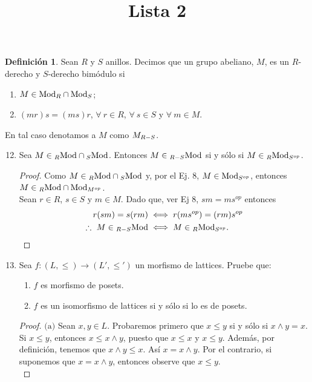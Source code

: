 \documentclass{article}
\title{Lista 2}
\author{}
\date{}
\newcommand{\lrprth}[1]{
	\left(#1\right)
}
\newcommand{\opst}[1]{
	{#1}^{op}
}
\newcommand{\ringmod}[3]{
	\if#3l
	{}_{#1}#2
	\else
	\if#3r
	#2_{#1}
	\fi
	\fi
}
\newcommand{\ringbimod}[4]{
	\if#4l
	{}_{#1-#2}#3
	\else
	\if#4r
	#3_{#1-#2}
	\else 
	\ifstrequal{#4}{lr}{
		{}_{#1}#3_{#2}
	}
	\fi
	\fi
}
\theoremstyle{definition}
\newtheorem{define}{Definición}
\theoremstyle{plain}
\theoremstyle{plain}
\theoremstyle{definition}
\theoremstyle{definition}
\theoremstyle{definition}
\theoremstyle{definition}
\theoremstyle{definition}
\theoremstyle{definition}
\begin{document}
	
	\maketitle
\begin{define}
	Sean $R$ y $S$ anillos. Decimos que un grupo abeliano, $M$, es un $R$-derecho y $S$-derecho bimódulo si
	\begin{enumerate}[label=\roman*)]
		\item $M\in\ringmod{R}{\text{Mod}}{r}\cap\ringmod{S}{\text{Mod}}{r}$;
		\item $(mr)s=(ms)r$, $\forall\ r\in R$, $\forall\ s\in S$ y $\forall\ m\in M$.
	\end{enumerate}
	En tal caso denotamos a $M$ como $\ringbimod{R}{S}{M}{r}$.
\end{define}
	\begin{enumerate}[label=\textbf{Ej \arabic*.}]
		\setcounter{enumi}{11}
\item Sea $M\in\ringmod{R}{\text{Mod}}{l}\cap\ringmod{S}{\text{Mod}}{l}$. Entonces $M\in\ringbimod{R}{S}{\text{Mod}}{l}$ si y sólo si $M\in\ringbimod{R}{\opst{S}}{\text{Mod}}{lr}$.
\begin{proof}
	Como $M\in\ringmod{R}{\text{Mod}}{l}\cap\ringmod{S}{\text{Mod}}{l}$ y, por el Ej. 8, $M\in\ringmod{\opst{S}}{\text{Mod}}{r}$, entonces $M\in\ringmod{R}{\text{Mod}}{l}\cap\ringmod{\opst{M}}{\text{Mod}}{r}$.\\ Sean $r\in R$, $s\in S$ y $m\in M$. 
	Dado que, ver Ej 8, $sm=ms^{op}$ entonces 
	\begin{align*}
		r(sm)=s(rm)&\iff r(m\opst{s})=(rm)\opst{s}\\
		\therefore\  M\in\ringbimod{R}{S}{\text{Mod}}{l}&\iff M\in\ringbimod{R}{\opst{S}}{\text{Mod}}{lr}.
	\end{align*}
\end{proof}
\item Sea $f:\lrprth{L, \leq } \longrightarrow \lrprth{L', \leq '}$ un morfismo de lattices. Pruebe que:
\begin{enumerate}
	\item $f$ es morfismo de posets.
	\item $f$ es un isomorfismo de lattices si y sólo si lo es de posets.
\end{enumerate}
\begin{proof}
	$\boxed{\text{(a)}}$ Sean $x,y \in L$. Probaremos primero que $x \leq y$ si y sólo si $x \wedge y = x$. Si $x \leq y$, entonces $x \leq x \wedge y$, puesto que $x \leq x$ y $x \leq y$. Además, por definición, tenemos que $x \wedge y \leq x$. Así $x = x \wedge y$. Por el contrario, si suponemos que $x = x \wedge y$, entonces observe que $x \leq y$.\\
	

\end{proof}
\end{enumerate}
\end{document}
